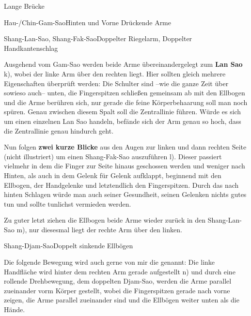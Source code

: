 \begin{WTSatz}{Lange Br\"ucke}
\begin{WTSatzTeil}{Hau-/Chin-Gam-Sao}{Hinten und Vorne Dr\"uckende Arme}
	\end{WTSatzTeil}
	\begin{WTSatzTeil}{Shang-Lan-Sao, Shang-Fak-Sao}{Doppelter Riegelarm, Doppelter Handkantenschlag}
		
		Ausgehend vom Gam-Sao werden beide Arme \"ubereinandergelegt zum \textbf{Lan Sao} k), wobei der linke Arm \"uber den rechten liegt. Hier sollten gleich mehrere Eigenschaften \"uberpr\"uft werden: Die Schulter sind --wie die ganze Zeit \"uber sowieso auch-- unten, die Fingerspitzen schlie{\ss}en gemeinsam ab mit den Ellbogen und die Arme ber\"uhren sich, nur gerade die feine K\"orperbehaarung soll man noch sp\"uren. Genau zwischen diesem Spalt soll die Zentrallinie f\"uhren. W\"urde es sich um einen einzelnen Lan Sao handeln, bef\"ande sich der Arm genau so hoch, dass die Zentrallinie genau hindurch geht.
		
		
		Nun folgen \textbf{zwei kurze Blicke} aus den Augen zur linken und dann rechten Seite (nicht illustriert) um einen Shang-Fak-Sao auszuf\"uhren l). Dieser passiert vielmehr in dem die Finger zur Seite hinaus geschossen werden und weniger nach Hinten, als auch in dem Gelenk f\"ur Gelenk aufklappt, beginnend mit den Ellbogen, der Handgelenke und letztendlich den Fingerspitzen. Durch das nach hinten Schlagen w\"urde man auch seiner Gesundheit, seinen Gelenken nichts gutes tun und sollte tunlichst vermieden werden.
		
		Zu guter letzt ziehen die Ellbogen beide Arme wieder zur\"uck in den Shang-Lan-Sao m), nur diesesmal liegt der rechte Arm \"uber den linken.
		
	\end{WTSatzTeil}
	\begin{WTSatzTeil}{Shang-Djam-Sao}{Doppelt sinkende Ellb\"ogen}
		
		Die folgende Bewegung wird auch gerne von mir die  genannt: Die linke Handfl\"ache wird hinter dem rechten Arm gerade aufgestellt n) und durch eine rollende Drehbewegung, dem doppelten Djam-Sao, werden die Arme parallel zueinander vorm K\"orper gestellt, wobei die Fingerspitzen gerade nach vorne zeigen, die Arme parallel zueinander sind und die Ellb\"ogen weiter unten als die H\"ande.
		

\end{WTSatzTeil}
\end{WTSatz}
